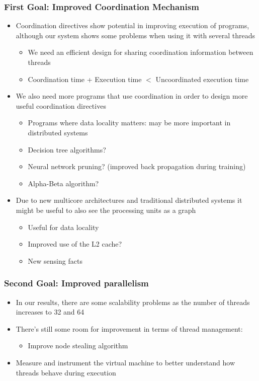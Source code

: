 \documentclass{beamer}
\begin{document}
\begin{frame}[fragile]
   \frametitle{First Goal: Improved Coordination Mechanism}
   \begin{itemize}
      \item Coordination directives show potential in improving execution of programs, although our system shows some problems when using it with several threads
      \begin{itemize}
         \item We need an efficient design for sharing coordination information between threads
         \item Coordination time + Execution time $<$ Uncoordinated execution time
      \end{itemize}
      \item We also need more programs that use coordination in order to design more useful coordination directives
      \begin{itemize}
         \item Programs where data locality matters: may be more important in distributed systems
         \item Decision tree algorithms?
         \item Neural network pruning? (improved back propagation during training)
         \item Alpha-Beta algorithm?
      \end{itemize}
      \item Due to new multicore architectures and traditional distributed systems it might be useful to also see the processing units as a graph
      \begin{itemize}
         \item Useful for data locality
         \item Improved use of the L2 cache?
         \item New sensing facts
      \end{itemize}
   \end{itemize}
\end{frame}

\begin{frame}[fragile]
   \frametitle{Second Goal: Improved parallelism}
   \begin{itemize}
      \item In our results, there are some scalability problems as the number of threads increases to 32 and 64
      \item There's still some room for improvement in terms of thread management:
      \begin{itemize}
         \item Improve node stealing algorithm
      \end{itemize}
      \item Measure and instrument the virtual machine to better understand how threads behave during execution
   \end{itemize}
\end{frame}
\end{document}
